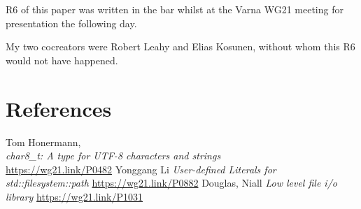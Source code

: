 \documentclass[11pt]{article}
\begin{document}
R6 of this paper was written in the bar whilst at the Varna WG21 meeting
for presentation the following day.

My two cocreators were Robert Leahy and Elias Kosunen, without whom this
R6 would not have happened.

\section{References}
\let\oldsection=\section
\renewcommand{\section}[2]{}%
\begin{thebibliography}{9}
    Tom Honermann,\\
    \emph{char8\_t: A type for UTF-8 characters and strings}\\
    \url{https://wg21.link/P0482}
    Yonggang Li\newline
    \emph{User-defined Literals for std::filesystem::path}\newline
    \url{https://wg21.link/P0882}
    Douglas, Niall\newline
    \emph{Low level file i/o library}\newline
    \url{https://wg21.link/P1031}
\end{thebibliography}
\let\section=\oldsection
\end{document}
